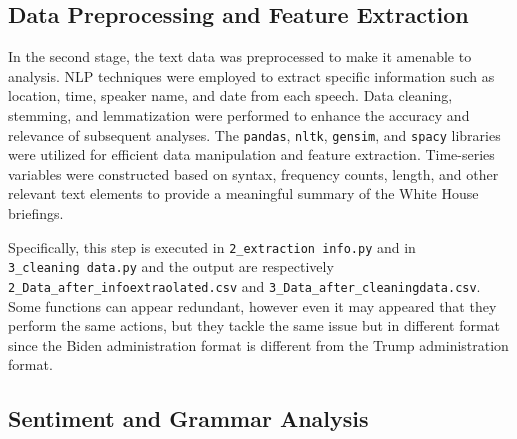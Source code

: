 \documentclass{article}
\begin{document}
\subsection{Data Preprocessing and Feature Extraction}

In the second stage, the text data was preprocessed to make it amenable to analysis. NLP techniques were employed to extract specific information such as location, time, speaker name, and date from each speech. Data cleaning, stemming, and lemmatization were performed to enhance the accuracy and relevance of subsequent analyses. The \texttt{pandas}, \texttt{nltk}, \texttt{gensim}, and \texttt{spacy} libraries were utilized for efficient data manipulation and feature extraction. Time-series variables were constructed based on syntax, frequency counts, length, and other relevant text elements to provide a meaningful summary of the White House briefings.
\par 
Specifically, this step is executed in \texttt{2\_extraction\ info.py} and in \texttt{3\_cleaning\ data.py} and the output are respectively  \texttt{2\_Data\_after\_infoextraolated.csv} and \texttt{3\_Data\_after\_cleaningdata.csv}.
Some functions can appear redundant, however even it may appeared that they perform the same actions, but they tackle the same issue but in different format since the Biden administration format is different from the Trump administration format.

\subsection{Sentiment and Grammar Analysis}
\end{document}
